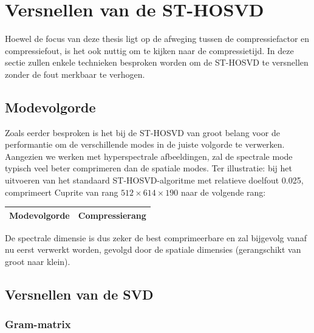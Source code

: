 \section{Versnellen van de ST-HOSVD}

Hoewel de focus van deze thesis ligt op de afweging tussen de compressiefactor en compressiefout, is het ook nuttig om te kijken naar de compressietijd. In deze sectie zullen enkele technieken besproken worden om de ST-HOSVD te versnellen zonder de fout merkbaar te verhogen.

\subsection{Modevolgorde}

Zoals eerder besproken is het bij de ST-HOSVD van groot belang voor de performantie om de verschillende modes in de juiste volgorde te verwerken. Aangezien we werken met hyperspectrale afbeeldingen, zal de spectrale mode typisch veel beter comprimeren dan de spatiale modes. Ter illustratie: bij het uitvoeren van het standaard ST-HOSVD-algoritme met relatieve doelfout 0.025, comprimeert Cuprite van rang $512 \times 614 \times 190$ naar de volgende rang:
\begin{table}[H]
\centering
\begin{tabular}{|l|l|}
\hline
Modevolgorde & Compressierang \\ \hline

\end{tabular}
\end{table}
De spectrale dimensie is dus zeker de best comprimeerbare en zal bijgevolg vanaf nu eerst verwerkt worden, gevolgd door de spatiale dimensies (gerangschikt van groot naar klein).

\subsection{Versnellen van de SVD}

\subsubsection{Gram-matrix}

